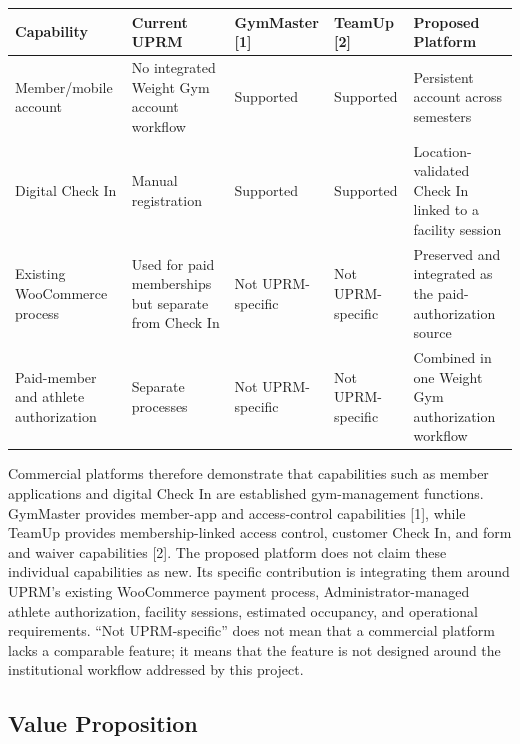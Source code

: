 \documentclass[11pt,letterpaper]{article}
\begin{document}
\begin{center}
\small
\begin{tabularx}{0.98\textwidth}{L{3.2cm} L{2.5cm} L{2.5cm} L{2.5cm} X}
\toprule
\textbf{Capability} &
\textbf{Current UPRM} &
\textbf{GymMaster [1]} &
\textbf{TeamUp [2]} &
\textbf{Proposed Platform} \\
\midrule

Member/mobile account
&
No integrated Weight Gym account workflow
&
Supported
&
Supported
&
Persistent account across semesters \\

\addlinespace

Digital Check In
&
Manual registration
&
Supported
&
Supported
&
Location-validated Check In linked to a facility session \\

\addlinespace

Existing WooCommerce process
&
Used for paid memberships but separate from Check In
&
Not UPRM-specific
&
Not UPRM-specific
&
Preserved and integrated as the paid-authorization source \\

\addlinespace

Paid-member and athlete authorization
&
Separate processes
&
Not UPRM-specific
&
Not UPRM-specific
&
Combined in one Weight Gym authorization workflow \\

\bottomrule
\end{tabularx}
\end{center}

Commercial platforms therefore demonstrate that capabilities such as member applications and digital Check In are established gym-management functions. GymMaster provides member-app and access-control capabilities [1], while TeamUp provides membership-linked access control, customer Check In, and form and waiver capabilities [2]. The proposed platform does not claim these individual capabilities as new. Its specific contribution is integrating them around UPRM's existing WooCommerce payment process, Administrator-managed athlete authorization, facility sessions, estimated occupancy, and operational requirements. ``Not UPRM-specific'' does not mean that a commercial platform lacks a comparable feature; it means that the feature is not designed around the institutional workflow addressed by this project.

\subsection{Value Proposition}
\end{document}

